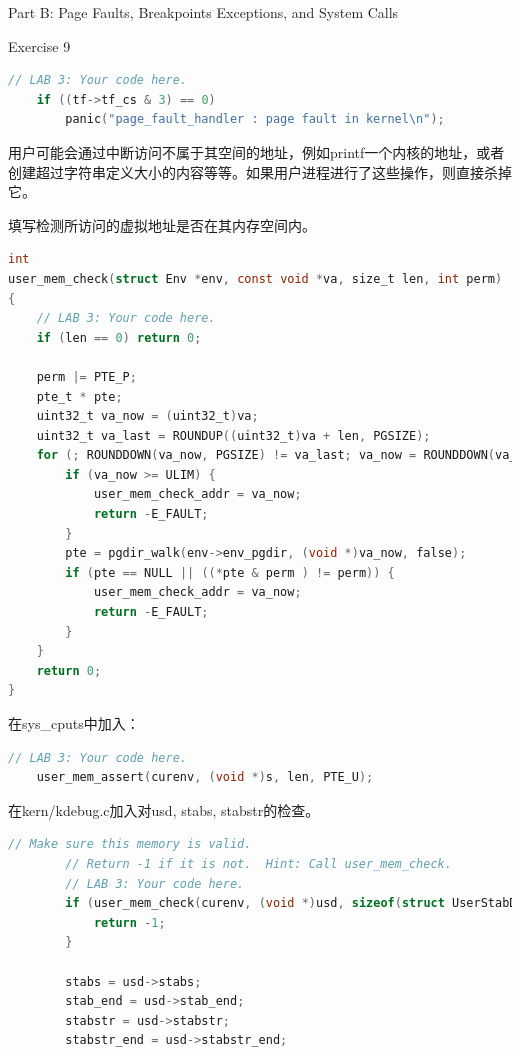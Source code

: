 \documentclass[GBK,winfonts,a4paper,10pt]{ctexart}
\begin{document}
\begin{section}{ Part B: Page Faults, Breakpoints Exceptions, and System Calls }
\begin{subsection}{ Exercise 9 }
\begin{lstlisting}[language=C]
	// LAB 3: Your code here.
	if ((tf->tf_cs & 3) == 0)
    	panic("page_fault_handler : page fault in kernel\n");
\end{lstlisting}

\par
用户可能会通过中断访问不属于其空间的地址，例如printf一个内核的地址，或者创建超过字符串定义大小的内容等等。如果用户进程进行了这些操作，则直接杀掉它。
\par
填写检测所访问的虚拟地址是否在其内存空间内。
\begin{lstlisting}[language=C]
int
user_mem_check(struct Env *env, const void *va, size_t len, int perm)
{
	// LAB 3: Your code here.
	if (len == 0) return 0;		

	perm |= PTE_P;
	pte_t * pte;
	uint32_t va_now = (uint32_t)va;
	uint32_t va_last = ROUNDUP((uint32_t)va + len, PGSIZE);
	for (; ROUNDDOWN(va_now, PGSIZE) != va_last; va_now = ROUNDDOWN(va_now + PGSIZE, PGSIZE)) {
		if (va_now >= ULIM) {
			user_mem_check_addr = va_now;
			return -E_FAULT;
		}
		pte = pgdir_walk(env->env_pgdir, (void *)va_now, false);
		if (pte == NULL || ((*pte & perm ) != perm)) {
			user_mem_check_addr = va_now;
			return -E_FAULT;
		}
	}
	return 0;
}
\end{lstlisting}
\par
在sys\_cputs中加入：
\begin{lstlisting}[language=C]
	// LAB 3: Your code here.
    user_mem_assert(curenv, (void *)s, len, PTE_U);
\end{lstlisting}

\par
在kern/kdebug.c加入对usd, stabs, stabstr的检查。
\begin{lstlisting}[language=C]
		// Make sure this memory is valid.
		// Return -1 if it is not.  Hint: Call user_mem_check.
		// LAB 3: Your code here.
		if (user_mem_check(curenv, (void *)usd, sizeof(struct UserStabData), PTE_U) < 0) {
			return -1;
		}

		stabs = usd->stabs;
		stab_end = usd->stab_end;
		stabstr = usd->stabstr;
		stabstr_end = usd->stabstr_end;


\end{lstlisting}
\end{subsection}
\end{section}
\end{document}
